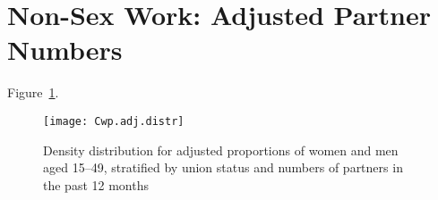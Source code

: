 \section{Non-Sex Work: Adjusted Partner Numbers}\label{app.model.nsw}
Figure~\ref{fig:Cwp.adj.dens}.
\begin{figure}[h]
  \centering
  \texttt{[image: Cwp.adj.distr]}
  \caption{Density distribution for adjusted proportions of women and men aged 15--49,
    stratified by union status and numbers of partners in the past 12 months}
  \label{fig:Cwp.adj.dens}
\end{figure}